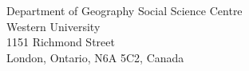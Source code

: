 \recipient
  {Department of Geography}
  {Social Science Centre\\Western University\\1151 Richmond Street\\London, Ontario, N6A 5C2, Canada}
